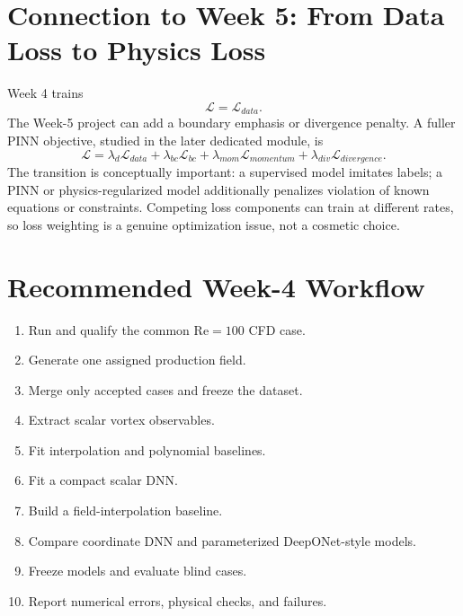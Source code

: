 \documentclass[11pt]{article}
\newcommand{\Rey}{\mathrm{Re}}
\begin{document}
\section{Connection to Week 5: From Data Loss to Physics Loss}
Week 4 trains
\begin{equation}
\mathcal{L}=\mathcal{L}_{data}.
\end{equation}
The Week-5 project can add a boundary emphasis or divergence penalty. A fuller PINN objective, studied in the later dedicated module, is
\begin{equation}
\mathcal{L}=\lambda_d\mathcal{L}_{data}+\lambda_{bc}\mathcal{L}_{bc}
+\lambda_{mom}\mathcal{L}_{momentum}+\lambda_{div}\mathcal{L}_{divergence}.
\end{equation}
The transition is conceptually important: a supervised model imitates labels; a PINN or physics-regularized model additionally penalizes violation of known equations or constraints. Competing loss components can train at different rates, so loss weighting is a genuine optimization issue, not a cosmetic choice.

\section{Recommended Week-4 Workflow}
\begin{enumerate}
\item Run and qualify the common $\Rey=100$ CFD case.
\item Generate one assigned production field.
\item Merge only accepted cases and freeze the dataset.
\item Extract scalar vortex observables.
\item Fit interpolation and polynomial baselines.
\item Fit a compact scalar DNN.
\item Build a field-interpolation baseline.
\item Compare coordinate DNN and parameterized DeepONet-style models.
\item Freeze models and evaluate blind cases.
\item Report numerical errors, physical checks, and failures.
\end{enumerate}
\end{document}
